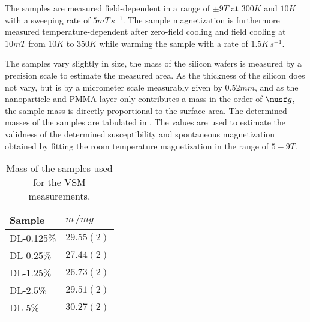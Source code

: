 \documentclass[\main/dresen_thesis.tex]{subfiles}
\begin{document}
    The samples are measured field-dependent in a range of $\pm 9 \unit{T}$ at $300 \unit{K}$ and $10 \unit{K}$ with a sweeping rate of $5 \unit{mT \, s^{-1}}$.
    The sample magnetization is furthermore measured temperature-dependent after zero-field cooling and field cooling at $10 \unit{mT}$ from $10 \unit{K}$ to $350 \unit{K}$ while warming the sample with a rate of $1.5 \unit{K \, s^{-1}}$.

    The samples vary slightly in size, the mass of the silicon wafers is measured by a precision scale to estimate the measured area. As the thickness of the silicon does not vary, but is by a micrometer scale measurably given by $0.52 \unit{mm}$, and as the nanoparticle and PMMA layer only contributes a mass in the order of $\musf g$, the sample mass is directly proportional to the surface area.
    The determined masses of the samples are tabulated in .
    The values are used to estimate the validness of the determined susceptibility and spontaneous magnetization obtained by fitting the room temperature magnetization in the range of $5 - 9 \unit{T}$.

    \begin{table}[!htbp]
      \centering
      \caption{\label{tab:doubleLayers:layerCharacterization:ppmsMasses}Mass of the samples used for the VSM measurements.}
      \begin{tabular}{ l | l}
        \rule{0pt}{2ex} \textbf{Sample}  & $m \, / \unit{mg}$ \\
        \hline
        \rule{0pt}{2ex} DL-0.125\%   & $29.55(2)$ \\
        \rule{0pt}{2ex} DL-0.25\%    & $27.44(2)$ \\
        \rule{0pt}{2ex} DL-1.25\%    & $26.73(2)$ \\
        \rule{0pt}{2ex} DL-2.5\%     & $29.51(2)$ \\
        \rule{0pt}{2ex} DL-5\%       & $30.27(2)$ \\
        \hline
      \end{tabular}
    \end{table}
\end{document}
